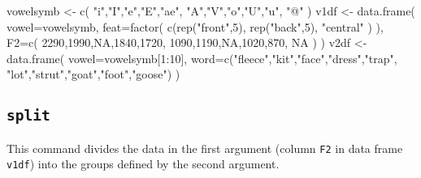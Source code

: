 \documentclass[
]{book}
\newenvironment{Shaded}{\begin{snugshade}}{\end{snugshade}}
\newcommand{\AttributeTok}[1]{\textcolor[rgb]{0.77,0.63,0.00}{#1}}
\newcommand{\ConstantTok}[1]{\textcolor[rgb]{0.00,0.00,0.00}{#1}}
\newcommand{\DecValTok}[1]{\textcolor[rgb]{0.00,0.00,0.81}{#1}}
\newcommand{\FunctionTok}[1]{\textcolor[rgb]{0.00,0.00,0.00}{#1}}
\newcommand{\NormalTok}[1]{#1}
\newcommand{\OtherTok}[1]{\textcolor[rgb]{0.56,0.35,0.01}{#1}}
\newcommand{\SpecialCharTok}[1]{\textcolor[rgb]{0.00,0.00,0.00}{#1}}
\newcommand{\StringTok}[1]{\textcolor[rgb]{0.31,0.60,0.02}{#1}}
\begin{document}
\begin{Shaded}
\begin{Highlighting}[]
\NormalTok{vowelsymb }\OtherTok{\textless{}{-}} \FunctionTok{c}\NormalTok{( }\StringTok{"i"}\NormalTok{,}\StringTok{"I"}\NormalTok{,}\StringTok{"e"}\NormalTok{,}\StringTok{"E"}\NormalTok{,}\StringTok{"ae"}\NormalTok{, }\StringTok{"A"}\NormalTok{,}\StringTok{"V"}\NormalTok{,}\StringTok{"o"}\NormalTok{,}\StringTok{"U"}\NormalTok{,}\StringTok{"u"}\NormalTok{, }\StringTok{"@"}\NormalTok{ )}
\NormalTok{v1df }\OtherTok{\textless{}{-}} \FunctionTok{data.frame}\NormalTok{( }\AttributeTok{vowel=}\NormalTok{vowelsymb,}
                    \AttributeTok{feat=}\FunctionTok{factor}\NormalTok{( }\FunctionTok{c}\NormalTok{(}\FunctionTok{rep}\NormalTok{(}\StringTok{"front"}\NormalTok{,}\DecValTok{5}\NormalTok{),}
                                   \FunctionTok{rep}\NormalTok{(}\StringTok{"back"}\NormalTok{,}\DecValTok{5}\NormalTok{),}
                                   \StringTok{"central"}\NormalTok{ ) ),}
                    \AttributeTok{F2=}\FunctionTok{c}\NormalTok{( }\DecValTok{2290}\NormalTok{,}\DecValTok{1990}\NormalTok{,}\ConstantTok{NA}\NormalTok{,}\DecValTok{1840}\NormalTok{,}\DecValTok{1720}\NormalTok{, }
                          \DecValTok{1090}\NormalTok{,}\DecValTok{1190}\NormalTok{,}\ConstantTok{NA}\NormalTok{,}\DecValTok{1020}\NormalTok{,}\DecValTok{870}\NormalTok{,}
                          \ConstantTok{NA}\NormalTok{ ) )}
\NormalTok{v2df }\OtherTok{\textless{}{-}} \FunctionTok{data.frame}\NormalTok{( }\AttributeTok{vowel=}\NormalTok{vowelsymb[}\DecValTok{1}\SpecialCharTok{:}\DecValTok{10}\NormalTok{], }
                    \AttributeTok{word=}\FunctionTok{c}\NormalTok{(}\StringTok{"fleece"}\NormalTok{,}\StringTok{"kit"}\NormalTok{,}\StringTok{"face"}\NormalTok{,}\StringTok{"dress"}\NormalTok{,}\StringTok{"trap"}\NormalTok{, }
                           \StringTok{"lot"}\NormalTok{,}\StringTok{"strut"}\NormalTok{,}\StringTok{"goat"}\NormalTok{,}\StringTok{"foot"}\NormalTok{,}\StringTok{"goose"}\NormalTok{) )}
\end{Highlighting}
\end{Shaded}

\hypertarget{split}{%
\subsection{\texorpdfstring{\texttt{split}}{split}}\label{split}}

This command divides the data in the first argument (column \texttt{F2} in
data frame \texttt{v1df}) into the groups defined by the second argument.
\end{document}
